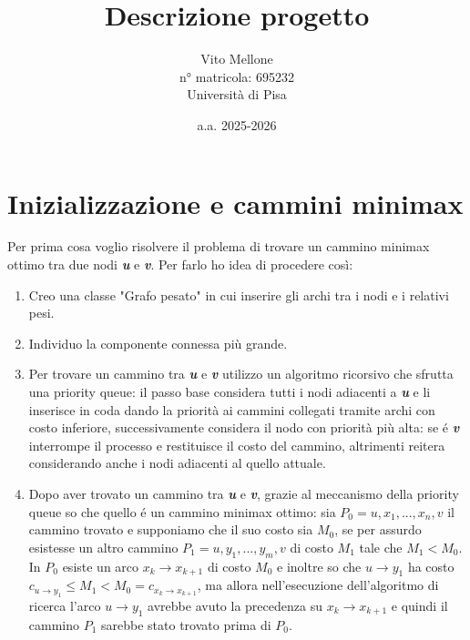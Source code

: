\documentclass {article}
\title{Descrizione progetto}
\author{ 
        Vito Mellone \\
        n° matricola: 695232\\
        Università di Pisa\\}
\date{a.a. 2025-2026}
\begin{document}
\maketitle

\section{Inizializzazione e cammini minimax}

Per prima cosa voglio risolvere il problema di trovare un cammino 
minimax ottimo tra due nodi \textbf{\textit{u}} e \textbf{\textit{v}}.
Per farlo ho idea di procedere così: 

\begin{enumerate}

\item   Creo una classe "Grafo pesato" in cui inserire gli archi
        tra i nodi e i relativi pesi.
\item   Individuo la componente connessa più grande.
\item   Per trovare un cammino tra \textbf{\textit{u}} e 
        \textbf{\textit{v}} utilizzo un algoritmo ricorsivo
        che sfrutta una priority queue: il passo base considera 
        tutti i nodi adiacenti a \textbf{\textit{u}} e li inserisce
        in coda dando la priorità ai cammini collegati tramite
        archi con costo inferiore, successivamente considera
        il nodo con priorità più alta: se é \textbf{\textit{v}}
        interrompe il processo e restituisce il costo del cammino, 
        altrimenti reitera considerando anche i nodi adiacenti
        al quello attuale.
\item   Dopo aver trovato un cammino tra \textbf{\textit{u}} e \textbf{\textit{v}}, grazie al meccanismo della priority
        queue so che quello é un cammino minimax ottimo: sia $P_0 = u, x_1, ..., x_{n}, v$
        il cammino trovato e supponiamo che il suo costo sia $M_{0}$,
        se per assurdo esistesse un altro cammino $P_1 = u, y_1,...,y_{m},v$ di costo
        $M_1$ tale che $M_1 < M_0$. In $P_0$ esiste un arco $x_k \to x_{k+1}$
        di costo $M_0$ e inoltre so che $u \to y_{1}$ ha costo $c_{u \to y_{1}} \leq M_1 < M_{0} = c_{x_k \to x_{k+1}} $,
        ma allora nell'esecuzione dell'algoritmo di ricerca l'arco
        $u \to y_1$ avrebbe avuto la precedenza su $x_k \to x_{k+1}$ e quindi
        il cammino $P_1$ sarebbe stato trovato prima di $P_0$.
             
\end{enumerate}
 
\end{document}
